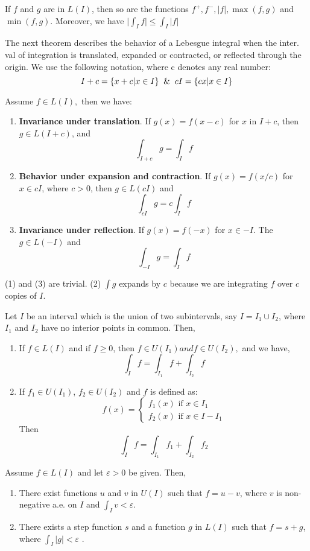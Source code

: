 \documentclass[10pt,a4paper]{book}
\begin{document}
\begin{Thm}
If $f$ and $g$ are in $L(I)$, then so are the functions $f^+, f^-, |f|,
\max(f, g)$ and $\min(f, g)$. Moreover, we have
        $\bigg|\int_I f\bigg| \leq \int_I |f|$
\end{Thm}
The next theorem describes the behavior of a Lebesgue integral when the inter. val of integration is translated, expanded or contracted, or reflected through the origin. We use the following notation, where c denotes any real number:
$$I+c = \{x +c| x\in I\} \And cI = \{cx| x \in I\}$$
\begin{Thm}
Assume $f \in L(I),$ then we have:
\begin{enumerate}
    \item \textbf{Invariance under translation}. If $g(x) = f(x - c)$ for $x$ in $I + c$, then $g \in L(I + c)$, and
    $$\int_{I+c} g = \int_I f$$
    \item \textbf{Behavior under expansion and contraction}. If $g(x) = f(x/c)$ for $ x \in cI$, where $c>0$, then $g \in L(cI)$ and
    $$\int_{cI}g = c\int_I f$$
    \item \textbf{Invariance under reflection}. If $g(x) = f(-x)$ for $x \in -I$. The $g \in L(-I)$ and
    $$\int_{-I} g = \int_{I}f$$
\end{enumerate}
\end{Thm}
\PP (1) and (3) are trivial. (2) $\int g$ expands by $c$ because we are integrating $f$ over $c$ copies of $I$.
\begin{Thm}
Let $I$ be an interval which is the union of two subintervals, say
$I = I_1 \cup I_2$, where $I_1$ and $I_2$ have no interior points in common. Then,
\begin{enumerate}
    \item If $f\in L(I)$ and if $f \geq 0$, then $f \in U(I_1) and f \in U(I_2),$ and we have,
    $$\int_I f = \int_{I_1} f + \int_{I_2} f$$
    \item If $f_1 \in U(I_1)$, $f_2 \in U(I_2)$ and $f$ is defined as:
    $$f(x) = \begin{cases}
    f_1(x) \text{ if } x \in I_1 \\
    f_2(x) \text{ if } x \in I - I_1 
    \end{cases} $$
    Then 
    $$\int_I f = \int_{I_1} f_1 + \int_{I_2}f_2$$
\end{enumerate}
\end{Thm}
\begin{Thm}
 Assume $f \in L(I)$ and let $\varepsilon > 0$ be given. Then,
\begin{enumerate}
    \item There exist functions $u$ and $v$ in $U(I)$ such that $f = u - v$, where $v$ is non-negative a.e. on $I$ and $\int_I v < \varepsilon$.
    \item There exists a step function $s$ and a function $g$ in $L(I)$ such that $f = s + g$, where $\int_I |g|< \varepsilon$ .
\end{enumerate}
\end{Thm}
\newcommand{\linf}[1][n]{\lim_{ #1 \to \infty}}
\newcommand{\sinf}[2][n]{\sum_{#1 = #2}^\infty}
\end{document}
